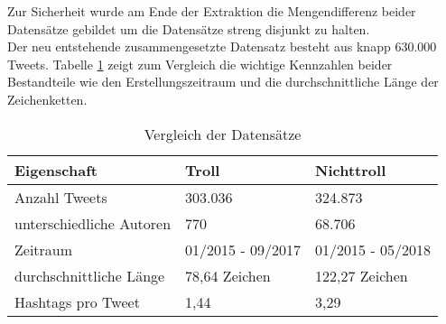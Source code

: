 Zur Sicherheit wurde am Ende der Extraktion die Mengendifferenz beider Datensätze gebildet um die Datensätze streng disjunkt zu halten.\\
Der neu entstehende zusammengesetzte Datensatz besteht aus knapp 630.000 Tweets. 
Tabelle \ref{tab_datasets} zeigt zum Vergleich die wichtige Kennzahlen beider Bestandteile wie den Erstellungszeitraum und die durchschnittliche Länge der Zeichenketten.
\begin{table}[htb]
	\begin{center}
		\begin{tabular}{|l|l|l|}
			\hline
		Eigenschaft					& Troll		& Nichttroll\\ \hline \hline
		Anzahl Tweets   			& 303.036	& 324.873	\\ \hline
		unterschiedliche Autoren    & 770		& 68.706		\\ \hline
		Zeitraum					& 01/2015 - 09/2017& 01/2015 - 05/2018\\ \hline
		durchschnittliche Länge		& 78,64 Zeichen	& 122,27 Zeichen\\ \hline
		Hashtags pro Tweet			& 1,44 & 3,29\\ \hline
		\end{tabular}
		\caption{Vergleich der Datensätze}\label{tab_datasets}
	\end{center}
\end{table}
\pagebreak